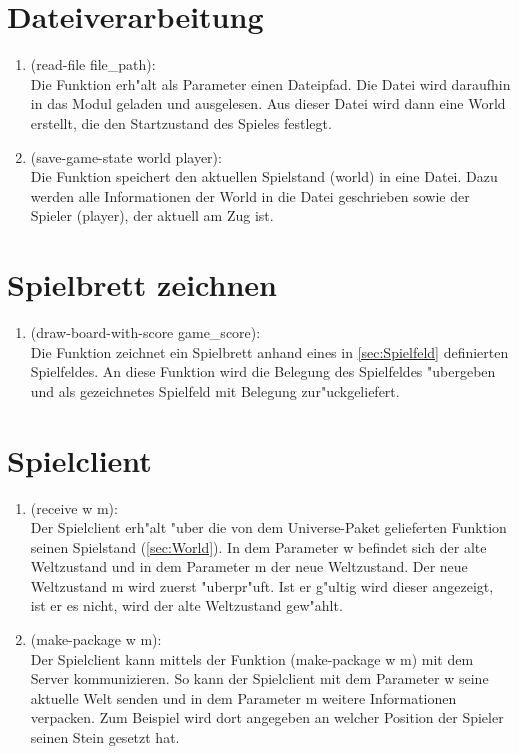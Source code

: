 \documentclass[a4paper]{scrreprt}
\begin{document}
\section{Dateiverarbeitung}

\begin{enumerate}
\item (read-file file\_path):\\
Die Funktion erh"alt als Parameter einen Dateipfad. Die Datei wird daraufhin in das Modul geladen und ausgelesen. Aus dieser Datei wird dann eine World erstellt, die den Startzustand des Spieles festlegt. 

\item (save-game-state world player):\\
Die Funktion speichert den aktuellen Spielstand (world) in eine Datei. Dazu werden alle Informationen der World in die Datei geschrieben sowie der Spieler (player), der aktuell am Zug ist. 

\end{enumerate}
\section{Spielbrett zeichnen}

\begin{enumerate}
\item (draw-board-with-score game\_score):\\
Die Funktion zeichnet ein Spielbrett anhand eines in \ref{sec:Spielfeld} definierten Spielfeldes. An diese Funktion wird die Belegung des Spielfeldes "ubergeben und als gezeichnetes Spielfeld mit Belegung zur"uckgeliefert. 
\end{enumerate}

\section{Spielclient}


\begin{enumerate}
\item (receive w m):\\
Der Spielclient erh"alt "uber die von dem Universe-Paket gelieferten Funktion seinen Spielstand (\ref{sec:World}). In dem Parameter w befindet sich der alte Weltzustand und in dem Parameter m der neue Weltzustand. Der neue Weltzustand m wird zuerst "uberpr"uft. Ist er g"ultig wird dieser angezeigt, ist er es nicht, wird der alte Weltzustand gew"ahlt.

\item (make-package w m):\\
Der Spielclient kann mittels der Funktion (make-package w m) mit dem Server kommunizieren. So kann der Spielclient mit dem Parameter w seine aktuelle Welt senden und in dem Parameter m weitere Informationen verpacken. Zum Beispiel wird dort angegeben an welcher Position der Spieler seinen Stein gesetzt hat.

\end{enumerate}
\end{document}
